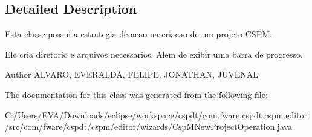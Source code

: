 \subsection{Detailed Description}
Esta classe possui a estrategia de acao na criacao de um projeto C\+S\+PM. 

Ele cria diretorio e arquivos necessarios. Alem de exibir uma barra de progresso. \begin{DoxyAuthor}{Author}
A\+L\+V\+A\+RO, E\+V\+E\+R\+A\+L\+DA, F\+E\+L\+I\+PE, J\+O\+N\+A\+T\+H\+AN, J\+U\+V\+E\+N\+AL 
\end{DoxyAuthor}


The documentation for this class was generated from the following file\+:\begin{DoxyCompactItemize}
\item 
C\+:/\+Users/\+E\+V\+A/\+Downloads/eclipse/workspace/cspdt/com.\+fware.\+cspdt.\+cspm.\+editor/src/com/fware/cspdt/cspm/editor/wizards/Csp\+M\+New\+Project\+Operation.\+java\end{DoxyCompactItemize}
